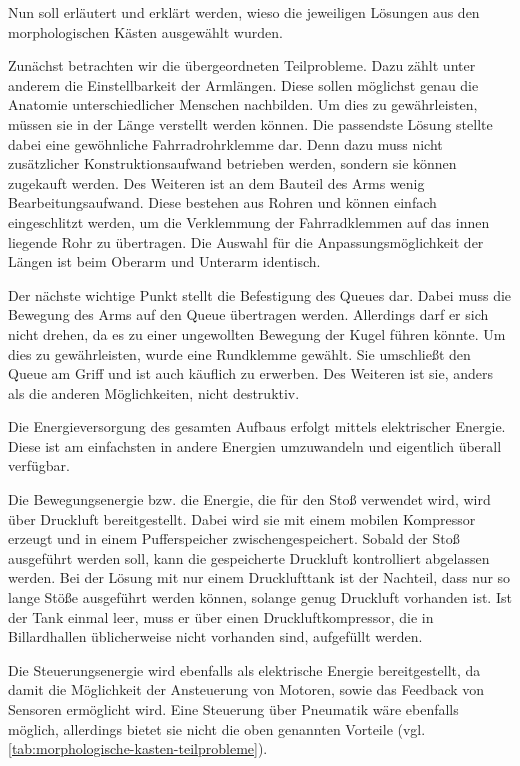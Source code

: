 		Nun soll erläutert und erklärt werden, wieso die jeweiligen Lösungen aus den morphologischen Kästen ausgewählt wurden.\par\medskip

		Zunächst betrachten wir die übergeordneten Teilprobleme. Dazu zählt unter anderem die Einstellbarkeit der Armlängen. Diese sollen möglichst genau die Anatomie unterschiedlicher Menschen nachbilden. Um dies zu gewährleisten, müssen sie in der Länge verstellt werden können. Die passendste Lösung stellte dabei eine gewöhnliche Fahrradrohrklemme dar. Denn dazu muss nicht zusätzlicher Konstruktionsaufwand betrieben werden, sondern sie können zugekauft werden. Des Weiteren ist an dem Bauteil des Arms wenig Bearbeitungsaufwand. Diese bestehen aus Rohren und können einfach eingeschlitzt werden, um die Verklemmung der Fahrradklemmen auf das innen liegende Rohr zu übertragen. Die Auswahl für die Anpassungsmöglichkeit der Längen ist beim Oberarm und Unterarm identisch.\par\medskip

		Der nächste wichtige Punkt stellt die Befestigung des Queues dar. Dabei muss die Bewegung des Arms auf den Queue übertragen werden. Allerdings darf er sich nicht drehen, da es zu einer ungewollten Bewegung der Kugel führen könnte. Um dies zu gewährleisten, wurde eine Rundklemme gewählt. Sie umschließt den Queue am Griff und ist auch käuflich zu erwerben. Des Weiteren ist sie, anders als die anderen Möglichkeiten, nicht destruktiv.\par\medskip
		
		Die Energieversorgung des gesamten Aufbaus erfolgt mittels elektrischer Energie. Diese ist am einfachsten in andere Energien umzuwandeln und eigentlich überall verfügbar.\par\medskip
		Die Bewegungsenergie bzw. die Energie, die für den Stoß verwendet wird, wird über Druckluft bereitgestellt. Dabei wird sie mit einem mobilen Kompressor erzeugt und in einem Pufferspeicher zwischengespeichert. Sobald der Stoß ausgeführt werden soll, kann die gespeicherte Druckluft kontrolliert abgelassen werden. Bei der Lösung mit nur einem Drucklufttank ist der Nachteil, dass nur so lange Stöße ausgeführt werden können, solange genug Druckluft vorhanden ist. Ist der Tank einmal leer, muss er über einen Druckluftkompressor, die in Billardhallen üblicherweise nicht vorhanden sind, aufgefüllt werden.\par\medskip
		
		Die Steuerungsenergie wird ebenfalls als elektrische Energie bereitgestellt, da damit die Möglichkeit der Ansteuerung von Motoren, sowie das Feedback von Sensoren ermöglicht wird. Eine Steuerung über Pneumatik wäre ebenfalls möglich, allerdings bietet sie nicht die oben genannten Vorteile (vgl. \cref{tab:morphologische-kasten-teilprobleme}).\par\medskip
		
